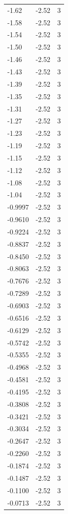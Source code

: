 \begin{longtable}{lrr}
  -1.62 & -2.52 & 3 \\
  -1.58 & -2.52 & 3 \\
  -1.54 & -2.52 & 3 \\
  -1.50 & -2.52 & 3 \\
  -1.46 & -2.52 & 3 \\
  -1.43 & -2.52 & 3 \\
  -1.39 & -2.52 & 3 \\
  -1.35 & -2.52 & 3 \\
  -1.31 & -2.52 & 3 \\
  -1.27 & -2.52 & 3 \\
  -1.23 & -2.52 & 3 \\
  -1.19 & -2.52 & 3 \\
  -1.15 & -2.52 & 3 \\
  -1.12 & -2.52 & 3 \\
  -1.08 & -2.52 & 3 \\
  -1.04 & -2.52 & 3 \\
  -0.9997 & -2.52 & 3 \\
  -0.9610 & -2.52 & 3 \\
  -0.9224 & -2.52 & 3 \\
  -0.8837 & -2.52 & 3 \\
  -0.8450 & -2.52 & 3 \\
  -0.8063 & -2.52 & 3 \\
  -0.7676 & -2.52 & 3 \\
  -0.7289 & -2.52 & 3 \\
  -0.6903 & -2.52 & 3 \\
  -0.6516 & -2.52 & 3 \\
  -0.6129 & -2.52 & 3 \\
  -0.5742 & -2.52 & 3 \\
  -0.5355 & -2.52 & 3 \\
  -0.4968 & -2.52 & 3 \\
  -0.4581 & -2.52 & 3 \\
  -0.4195 & -2.52 & 3 \\
  -0.3808 & -2.52 & 3 \\
  -0.3421 & -2.52 & 3 \\
  -0.3034 & -2.52 & 3 \\
  -0.2647 & -2.52 & 3 \\
  -0.2260 & -2.52 & 3 \\
  -0.1874 & -2.52 & 3 \\
  -0.1487 & -2.52 & 3 \\
  -0.1100 & -2.52 & 3 \\
  -0.0713 & -2.52 & 3 \\

\end{longtable}
